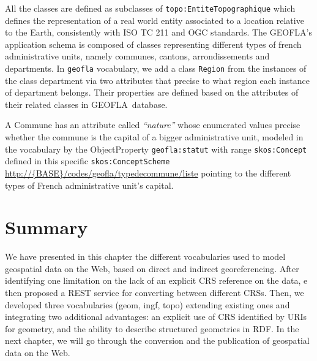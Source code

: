 All the classes are defined as subclasses of  \texttt{topo:EntiteTopographique} which defines the representation of a real world entity associated to a location relative to the Earth, consistently with ISO TC 211 and OGC standards. 
The GEOFLA\circledR 's application schema is composed of classes representing different types of french administrative units, namely communes, cantons, arrondissements and departments. In \texttt{geofla} vocabulary, we add a class \texttt{Region}  from the instances of the class department via two attributes  that precise to what region each instance of department belongs.  Their properties are defined based on the attributes of their related classes in GEOFLA\circledR ~database.

A Commune has an attribute called \textit{``nature''} whose enumerated values precise whether the commune is the capital of a bigger administrative unit, modeled in the vocabulary by the ObjectProperty \texttt{geofla:statut} with range \texttt{skos:Concept} defined in this specific \texttt{skos:ConceptScheme} \\ \url{http://{BASE}/codes/geofla/typedecommune/liste} pointing to the different types of French administrative unit's capital. 


\section{Summary}
\label{sec:summarych1}
We have presented in this chapter the different vocabularies used to model geospatial data on the Web, based on direct and indirect georeferencing. After identifying one limitation on the lack of an explicit CRS reference on the data, e then proposed a REST service for converting between different CRSs. Then, we developed three vocabularies (geom, ingf, topo) extending existing ones and integrating two additional advantages: an explicit use of CRS identified by URIs for geometry, and the ability to describe structured geometries in RDF. 
In the next chapter, we will go through the conversion and the publication of geospatial data on the Web.


